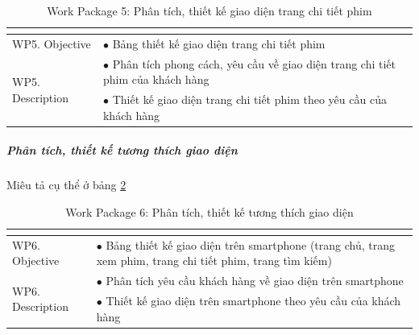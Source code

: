 \documentclass[a4paper]{book}
\begin{document}
\begin{table}[h!]
	\begin{center}
		\begin{tabular}{|p{4cm}|p{10cm}|}
			\hline
			\multicolumn{2}{|c|}{\cellcolor[HTML]{363636}{\color[HTML]{FFFFFF}Work package 5: Phân tích, thiết kế giao diện trang chi tiết phim}}\\
			\hline
			\multirow{1}{*}{WP5. Objective} & $\bullet$ Bảng thiết kế giao diện trang chi tiết phim\\
			\hline
			\multirow{2}{*}{WP5. Description} & $\bullet$ Phân tích phong cách, yêu cầu về giao diện trang chi tiết phim của khách hàng \\
			& $\bullet$ Thiết kế giao diện trang chi tiết phim theo yêu cầu của khách hàng\\
			\hline
		\end{tabular}
		\caption{Work Package 5: Phân tích, thiết kế giao diện trang chi tiết phim}
		\label{table:frontend_thietke_trangchitietphim}
	\end{center}
\end{table}
\subparagraph{Phân tích, thiết kế tương thích giao diện} Miêu tả cụ thể ở bảng \ref{table:frontend_thietke_tuongthich}
\begin{table}[h!]
	\begin{center}
		\begin{tabular}{|p{4cm}|p{10cm}|}
			\hline
			\multicolumn{2}{|c|}{\cellcolor[HTML]{363636}{\color[HTML]{FFFFFF}Work package 6: Phân tích, thiết kế tương thích giao diện}}\\
			\hline
			\multirow{1}{*}{WP6. Objective} & $\bullet$ Bảng thiết kế giao diện trên smartphone (trang chủ, trang xem phim, trang chi tiết phim, trang tìm kiếm)\\
			\hline
			\multirow{2}{*}{WP6. Description} & $\bullet$ Phân tích yêu cầu khách hàng về giao diện trên smartphone \\
			& $\bullet$ Thiết kế giao diện trên smartphone theo yêu cầu của khách hàng\\
			\hline
		\end{tabular}
		\caption{Work Package 6: Phân tích, thiết kế tương thích giao diện}
		\label{table:frontend_thietke_tuongthich}
	\end{center}
\end{table}
\end{document}
